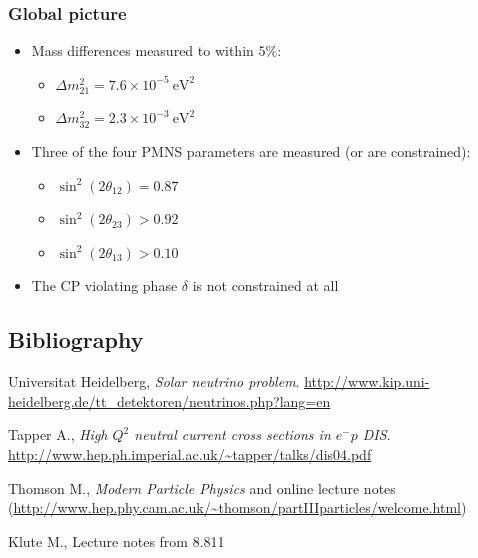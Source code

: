 \documentclass[11pt]{article}
\newcommand{\ev}{\text{eV}}
\newcommand{\el}{\ensuremath{e^{-}}}
\begin{document}
\subsubsection{Global picture}
\begin{itemize}
  \item Mass differences measured to within $5\%$:
  \begin{itemize}
    \item $\Delta m_{21}^2 = 7.6 \times 10^{-5}~\ev^2$
    \item $\Delta m_{32}^2 = 2.3 \times 10^{-3}~\ev^2$
  \end{itemize}
  \item Three of the four PMNS parameters are measured (or are constrained):
  \begin{itemize}
    \item $\sin^2(2\theta_{12}) = 0.87$
    \item $\sin^2(2\theta_{23}) > 0.92$
    \item $\sin^2(2\theta_{13}) > 0.10$
  \end{itemize}
  \item The CP violating phase $\delta$ is not constrained at all
\end{itemize}


\begin{appendices}
\section{Bibliography}

\vspace{5mm}

\noindent Universitat Heidelberg, \emph{Solar neutrino problem}. \url{http://www.kip.uni-heidelberg.de/tt_detektoren/neutrinos.php?lang=en}

\vspace{5mm}

\noindent Tapper A., \emph{High $Q^2$ neutral current cross sections in $\el p$ DIS}. \url{http://www.hep.ph.imperial.ac.uk/~tapper/talks/dis04.pdf}

\vspace{5mm}

\noindent Thomson M., \emph{Modern Particle Physics} and online lecture notes (\url{http://www.hep.phy.cam.ac.uk/~thomson/partIIIparticles/welcome.html})
\vspace{5mm}

\noindent Klute M., Lecture notes from 8.811

\end{appendices}
\end{document}
